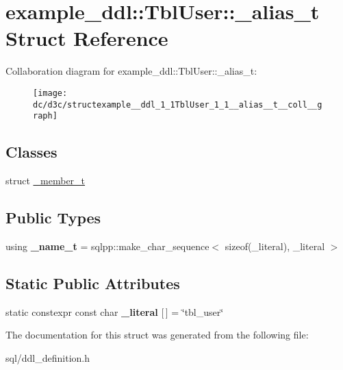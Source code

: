 \hypertarget{structexample__ddl_1_1TblUser_1_1__alias__t}{}\section{example\+\_\+ddl\+:\+:Tbl\+User\+:\+:\+\_\+alias\+\_\+t Struct Reference}
\label{structexample__ddl_1_1TblUser_1_1__alias__t}


Collaboration diagram for example\+\_\+ddl\+:\+:Tbl\+User\+:\+:\+\_\+alias\+\_\+t\+:
\nopagebreak
\begin{figure}[H]
\begin{center}
\leavevmode
\texttt{[image: dc/d3c/structexample\_\_ddl\_1\_1TblUser\_1\_1\_\_alias\_\_t\_\_coll\_\_graph]}
\end{center}
\end{figure}
\subsection*{Classes}
\begin{DoxyCompactItemize}
\item 
struct \hyperlink{structexample__ddl_1_1TblUser_1_1__alias__t_1_1__member__t}{\+\_\+member\+\_\+t}
\end{DoxyCompactItemize}
\subsection*{Public Types}
\begin{DoxyCompactItemize}
\item 
\hypertarget{structexample__ddl_1_1TblUser_1_1__alias__t_a03f291a72ea1515223603a8ee06c909c}{}using {\bfseries \+\_\+name\+\_\+t} = sqlpp\+::make\+\_\+char\+\_\+sequence$<$ sizeof(\+\_\+literal), \+\_\+literal $>$\label{structexample__ddl_1_1TblUser_1_1__alias__t_a03f291a72ea1515223603a8ee06c909c}

\end{DoxyCompactItemize}
\subsection*{Static Public Attributes}
\begin{DoxyCompactItemize}
\item 
\hypertarget{structexample__ddl_1_1TblUser_1_1__alias__t_a01eddf972e8c28e9c2b6e1597ad4b7ad}{}static constexpr const char {\bfseries \+\_\+literal} \mbox{[}$\,$\mbox{]} = \char`\"{}tbl\+\_\+user\char`\"{}\label{structexample__ddl_1_1TblUser_1_1__alias__t_a01eddf972e8c28e9c2b6e1597ad4b7ad}

\end{DoxyCompactItemize}


The documentation for this struct was generated from the following file\+:\begin{DoxyCompactItemize}
\item 
sql/ddl\+\_\+definition.\+h\end{DoxyCompactItemize}
